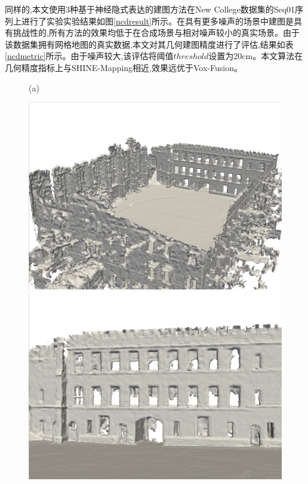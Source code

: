 同样的,本文使用3种基于神经隐式表达的建图方法在New College数据集的Seq01序列上进行了实验实验结果如图\ref{ncdresult}所示。在具有更多噪声的场景中建图是具有挑战性的,所有方法的效果均低于在合成场景与相对噪声较小的真实场景。由于该数据集拥有网格地图的真实数据,本文对其几何建图精度进行了评估,结果如表\ref{ncdmetric}所示。由于噪声较大,该评估将阈值$threshold$设置为20cm。本文算法在几何精度指标上与SHINE-Mapping相近,效果远优于Vox-Fusion。
\begin{figure}[htbp]
    \centering
    (a)
\begin{minipage}{0.322\linewidth}
    \centering
    \includegraphics[width=1\linewidth]{figures/ncd_3_vox.png}
\end{minipage}\hfill
\begin{minipage}{0.322\linewidth}
    \centering
    \includegraphics[width=1\linewidth]{figures/ncd_2_vox.png}

\end{minipage}
\end{figure}
